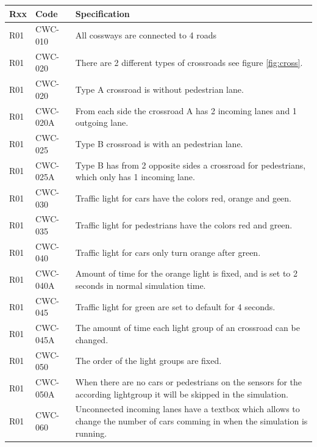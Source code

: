 \begin{tabularx}{\textwidth}{|p{0.5cm}p{2cm}X|}\hline
	Rxx & Code & Specification \\\hline
	R01 & CWC-010 & All cossways are connected to 4 roads\\\hline
	R01 & CWC-020 & There are 2 different types of crossroads see figure \ref{fig:cross}.\\\hline
	R01 & CWC-020 & Type A crossroad is without pedestrian lane.\\\hline
	R01 & CWC-020A & From each side the crossroad A has 2 incoming lanes and 1 outgoing lane.\\\hline
	R01 & CWC-025 & Type B crossroad is with an pedestrian lane.\\\hline
	R01 & CWC-025A & Type B has from 2 opposite sides a crossroad for pedestrians, which only has 1 incoming lane.\\\hline
	R01 & CWC-030 & Traffic light for cars have the colors red, orange and geen.\\\hline
	R01 & CWC-035 & Traffic light for pedestrians have the colors red and green.\\\hline
	R01 & CWC-040 & Traffic light for cars only turn orange after green.\\\hline
	R01 & CWC-040A & Amount of time for the orange light is fixed, and is set to 2 seconds in normal simulation time.\\\hline
	R01 & CWC-045 & Traffic light for green are set to default for 4 seconds.\\\hline
	R01 & CWC-045A & The amount of time each light group of an crossroad can be changed.\\\hline
	R01 & CWC-050 & The order of the light groups are fixed.\\\hline
	R01 & CWC-050A & When there are no cars or pedestrians on the sensors for the according lightgroup it will be skipped in the simulation.\\\hline
	R01 & CWC-060 & Unconnected incoming lanes have a textbox which allows to change the number of cars comming in when the simulation is running.\\\hline
\end{tabularx}

\newpage
